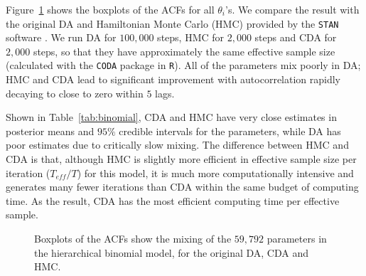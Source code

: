 \documentclass[12pt]{article}
\begin{document}
Figure~\ref{data_binomial} shows the boxplots of the ACFs for all $\theta_i$'s. We compare the result with the original DA \citep{polson2013bayesian} and Hamiltonian Monte Carlo (HMC) provided by the \texttt{STAN} software \citep{carpenter2016stan}. We run DA for $100,000$ steps, HMC for $2,000$ steps and CDA for $2,000$ steps, so that they have approximately the same effective sample size (calculated with the \texttt{CODA} package in \texttt{R}). All of the parameters mix poorly in DA; HMC and CDA lead to significant improvement with autocorrelation rapidly decaying to close to zero within $5$ lags.

Shown in Table~\ref{tab:binomial}, CDA and HMC have very close estimates in posterior means and $95\%$ credible intervals for the parameters, while DA has poor estimates due to critically slow mixing. The difference between HMC and CDA is that, although HMC is slightly more efficient in effective sample size per iteration ($T_{eff}/T$) for this model, it is much more computationally intensive and generates many fewer iterations than CDA within the same budget of computing time. As the result, CDA has the most efficient computing time per effective sample.  

 
\begin{figure}[H]
  {\caption{Boxplots of the ACFs show the mixing of the $59,792$ parameters in the hierarchical binomial model, for the original DA\citep{polson2013bayesian}, CDA and HMC. \label{data_binomial}}}
  {%
  }
\end{figure}
 
\end{document}
